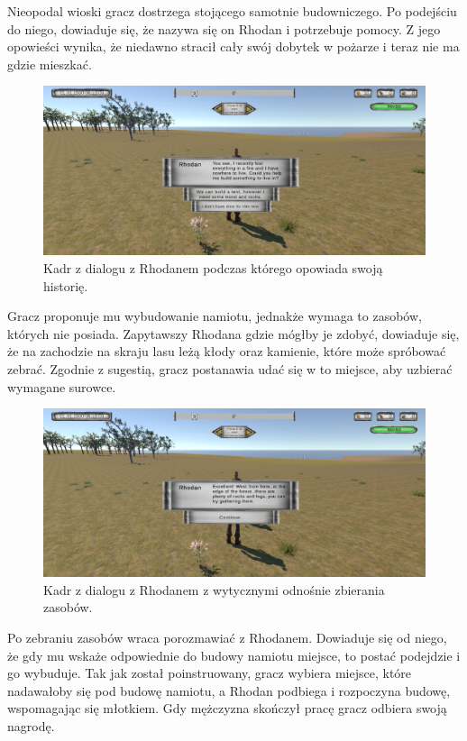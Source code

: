 Nieopodal wioski gracz dostrzega stojącego samotnie budowniczego. Po podejściu do niego, dowiaduje się, że nazywa się on
Rhodan i potrzebuje pomocy. Z jego opowieści wynika, że niedawno stracił cały swój dobytek w
pożarze i teraz nie ma gdzie mieszkać.

\begin{figure}[h!]
    \centering
    \includegraphics[width=1\textwidth]{images/rozgrywka/rhodan3.png}
    \caption{Kadr z dialogu z Rhodanem podczas którego opowiada swoją historię.}
\end{figure}
\FloatBarrier

Gracz proponuje mu wybudowanie namiotu, jednakże wymaga to zasobów, których nie posiada. Zapytawszy Rhodana gdzie mógłby
je zdobyć, dowiaduje się, że na zachodzie na skraju lasu leżą kłody oraz kamienie, które może spróbować zebrać. Zgodnie
z sugestią, gracz postanawia udać się w to miejsce, aby uzbierać wymagane surowce.

\begin{figure}[h!]
    \centering
    \includegraphics[width=1\textwidth]{images/rozgrywka/rhodan4.png}
    \caption{Kadr z dialogu z Rhodanem z wytycznymi odnośnie zbierania zasobów.}
\end{figure}
\FloatBarrier

Po zebraniu zasobów wraca porozmawiać z Rhodanem. Dowiaduje się od niego, że gdy mu wskaże odpowiednie do budowy namiotu
miejsce, to postać podejdzie i go wybuduje. Tak jak został poinstruowany, gracz wybiera miejsce, które nadawałoby się
pod budowę namiotu, a Rhodan podbiega i rozpoczyna budowę, wspomagając się młotkiem. Gdy mężczyzna skończył pracę gracz
odbiera swoją nagrodę.

